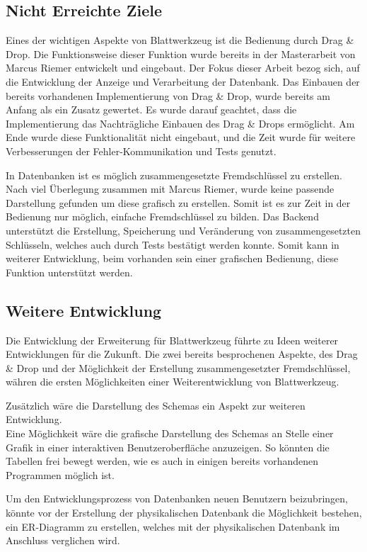 \subsection{Nicht Erreichte Ziele}
\label{subsec05:nicht_erreicht}
Eines der wichtigen Aspekte von Blattwerkzeug ist die Bedienung durch Drag \& Drop. Die Funktionsweise dieser Funktion wurde bereits in der Masterarbeit von Marcus Riemer entwickelt und eingebaut. 
Der Fokus dieser Arbeit bezog sich, auf die Entwicklung der Anzeige und Verarbeitung der Datenbank. Das Einbauen der bereits vorhandenen Implementierung von Drag \& Drop, wurde bereits am Anfang als ein Zusatz gewertet. Es wurde darauf geachtet, dass die Implementierung das Nachträgliche Einbauen des Drag \& Drops ermöglicht. Am Ende wurde diese Funktionalität nicht eingebaut, und die Zeit wurde für weitere Verbesserungen der Fehler-Kommunikation und Tests genutzt.

In Datenbanken ist es möglich zusammengesetzte Fremdschlüssel zu erstellen. Nach viel Überlegung zusammen mit Marcus Riemer, wurde keine passende Darstellung gefunden um diese grafisch zu erstellen. Somit ist es zur Zeit in der Bedienung nur möglich, einfache Fremdschlüssel zu bilden.
Das Backend unterstützt die Erstellung, Speicherung und Veränderung von zusammengesetzten Schlüsseln, welches auch durch Tests bestätigt werden konnte. Somit kann in weiterer Entwicklung, beim vorhanden sein einer grafischen Bedienung, diese Funktion unterstützt werden.

\subsection{Weitere Entwicklung}
\label{subsec05:future_dev}
Die Entwicklung der Erweiterung für Blattwerkzeug führte zu Ideen weiterer Entwicklungen für die Zukunft.
Die zwei bereits besprochenen Aspekte, des Drag \& Drop und der Möglichkeit der Erstellung zusammengesetzter Fremdschlüssel, währen die ersten Möglichkeiten einer Weiterentwicklung von Blattwerkzeug.

Zusätzlich wäre die Darstellung des Schemas ein Aspekt zur weiteren Entwicklung. \\
Eine Möglichkeit wäre die grafische Darstellung des Schemas an Stelle einer Grafik in einer interaktiven Benutzeroberfläche anzuzeigen. So könnten die Tabellen frei bewegt werden, wie es auch in einigen bereits vorhandenen Programmen möglich ist.

Um den Entwicklungsprozess von Datenbanken neuen Benutzern beizubringen, könnte vor der Erstellung der physikalischen Datenbank die Möglichkeit bestehen, ein ER-Diagramm zu erstellen, welches mit der physikalischen Datenbank im Anschluss verglichen wird.

